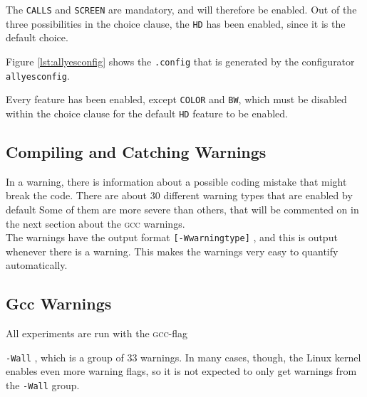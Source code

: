 \documentclass[a4paper,11pt]{report}
\newcommand{\textcode}[1]{
    \fboxsep=1pt
    \texttt{\colorbox{gray!20}{#1}}
}
\newcommand{\figa}{
    \begin{figure}[!htpb]
    \centering
}
\newcommand{\figb}[2]{
    \caption{#1}
    \label{#2}
    \end{figure}
}
\begin{document}
The \texttt{CALLS} and \texttt{SCREEN} are mandatory, and will 
therefore be enabled. Out of the three possibilities in the choice clause, the 
\texttt{HD} has been enabled, since it is the default choice.


\figa
    \subfigure[allnoconfig]{
        \label{lst:allnoconfig}
        
    }
    \qquad %
    \subfigure[allyesconfig]{
        \label{lst:allyesconfig}
        
    }
\figb{}{}


Figure \ref{lst:allyesconfig} shows the \texttt{.config} that is generated by 
the configurator \texttt{allyesconfig}.

Every feature has been enabled, except \texttt{COLOR} and \texttt{BW}, which 
must be disabled within the choice clause for the default \texttt{HD} feature 
to be enabled.



        \subsection{Compiling and Catching Warnings}
In a warning, there is information about a possible coding mistake that might 
break the code. There are about 30 different warning types that are enabled by 
default \cite{gccwarnings} Some of them are more severe than others, that will 
be commented on in the next section about the \textsc{gcc} warnings.
\\

The warnings have the output format \textcode{[-Wwarningtype]}, and this is 
output whenever there is a warning. This makes the warnings very easy to 
quantify automatically.




            \subsection{Gcc Warnings}
All experiments are run with the \textsc{gcc}-flag 
\textcode{-Wall}, which is a group of 33 warnings. In many cases, though, 
the Linux kernel enables even more warning flags, so it is not expected to only 
get warnings from the \texttt{-Wall} group.
\\
\end{document}
